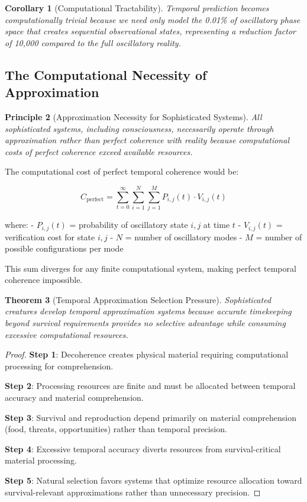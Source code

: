 \documentclass[11pt]{article}
\newtheorem{theorem}{Theorem}[section]
\newtheorem{corollary}[theorem]{Corollary}
\newtheorem{principle}[theorem]{Principle}
\theoremstyle{remark}
\begin{document}
\begin{corollary}[Computational Tractability]
Temporal prediction becomes computationally trivial because we need only model the 0.01\% of oscillatory phase space that creates sequential observational states, representing a reduction factor of 10,000 compared to the full oscillatory reality.
\end{corollary}

\subsection{The Computational Necessity of Approximation}

\begin{principle}[Approximation Necessity for Sophisticated Systems]
All sophisticated systems, including consciousness, necessarily operate through approximation rather than perfect coherence with reality because computational costs of perfect coherence exceed available resources.
\end{principle}

The computational cost of perfect temporal coherence would be:

$$C_{\text{perfect}} = \sum_{t=0}^{\infty} \sum_{i=1}^{N} \sum_{j=1}^{M} P_{i,j}(t) \cdot V_{i,j}(t)$$

where:
- $P_{i,j}(t)$ = probability of oscillatory state $i,j$ at time $t$
- $V_{i,j}(t)$ = verification cost for state $i,j$
- $N$ = number of oscillatory modes
- $M$ = number of possible configurations per mode

This sum diverges for any finite computational system, making perfect temporal coherence impossible.

\begin{theorem}[Temporal Approximation Selection Pressure]
Sophisticated creatures develop temporal approximation systems because accurate timekeeping beyond survival requirements provides no selective advantage while consuming excessive computational resources.
\end{theorem}

\begin{proof}
\textbf{Step 1}: Decoherence creates physical material requiring computational processing for comprehension.

\textbf{Step 2}: Processing resources are finite and must be allocated between temporal accuracy and material comprehension.

\textbf{Step 3}: Survival and reproduction depend primarily on material comprehension (food, threats, opportunities) rather than temporal precision.

\textbf{Step 4}: Excessive temporal accuracy diverts resources from survival-critical material processing.

\textbf{Step 5}: Natural selection favors systems that optimize resource allocation toward survival-relevant approximations rather than unnecessary precision.
\end{proof}
\end{document}
